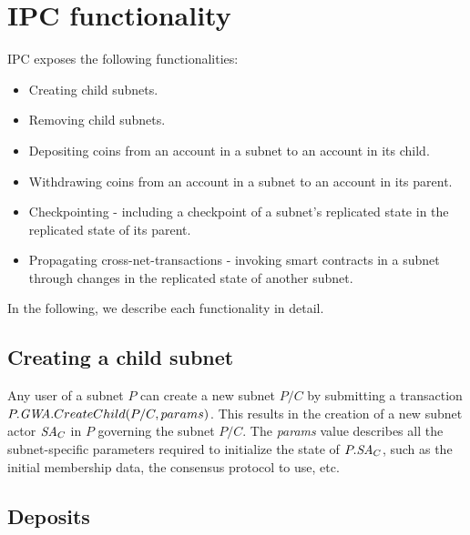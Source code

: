 \section{IPC functionality}
\label{sec:functionality}

IPC exposes the following functionalities:
\begin{itemize}
    \item Creating child subnets.
    \item Removing child subnets.
    \item Depositing coins from an account in a subnet to an account in its child.
    \item Withdrawing coins from an account in a subnet to an account in its parent.
    \item Checkpointing - including a checkpoint of a subnet's replicated state in the replicated state of its parent.
    \item Propagating cross-net-transactions - invoking smart contracts in a subnet through changes in the replicated state of another subnet.
\end{itemize}
In the following, we describe each functionality in detail.

\subsection{Creating a child subnet}

Any user of a subnet $P$ can create a new subnet $P/C$ by submitting a transaction $P.\textit{GWA}.CreateChild(P/C, params)$.
This results in the creation of a new subnet actor $\textit{SA}_C$ in $P$ governing the subnet $P/C$.
The \emph{params} value describes all the subnet-specific parameters required to initialize the state of $P.\textit{SA}_C$,
such as the initial membership data, the consensus protocol to use, etc.

\subsection{Deposits}
\label{sec:deposit}


